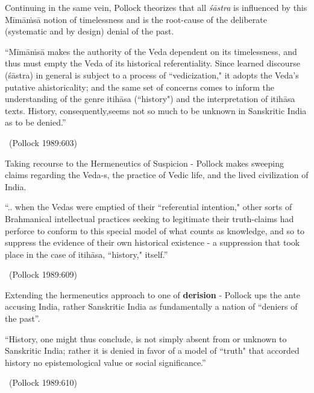 Continuing in the same vein, Pollock theorizes that all \textit{śāstra} is influenced by this Mīmāṁsā notion of timelessness and is the root-cause of the deliberate (systematic and by design) denial of the past.

\vskip 3pt

\begin{myquote}
“Mīmāṁsā makes the authority of the Veda dependent on its timelessness, and thus must empty the Veda of its historical referentiality. Since learned discourse (śāstra) in general is subject to a process of “vedicization," it adopts the Veda's putative ahistoricality; and the same set of concerns comes to inform the understanding of the genre itihāsa (“history") and the interpretation of itihāsa texts. History, consequently,\break seems not so much to be unknown in Sanskritic India as to be denied.”

~\hfill (Pollock 1989:603)
\end{myquote}

Taking recourse to the Hermeneutics of Suspicion - Pollock makes sweeping claims regarding the Veda-s, the practice of Vedic life, and the lived civilization of India.
\begin{myquote}
“.. when the Vedas were emptied of their “referential intention," other sorts of Brahmanical intellectual practices seeking to legitimate their truth-claims had perforce to conform to this special model of what counts as knowledge, and so to suppress the evidence of their own historical existence - a suppression that took place in the case of itihāsa, “history," itself.”

~\hfill (Pollock 1989:609)
\end{myquote}

Extending the hermeneutics approach to one of \textbf{derision }- Pollock ups the ante accusing India, rather Sanskritic India as fundamentally a nation of “deniers of the past”.
\begin{myquote}
“History, one might thus conclude, is not simply absent from or unknown to Sanskritic India; rather it is denied in favor of a model of ``truth" that accorded history no epistemological value or social significance.”

~\hfill (Pollock 1989:610)
\end{myquote}

